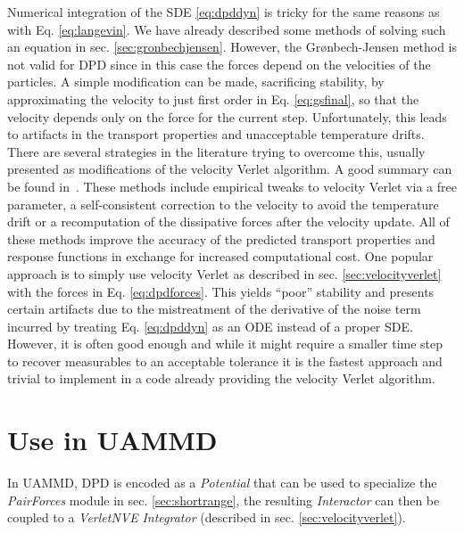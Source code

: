 \documentclass[twoside,openright,titlepage,numbers=noenddot,%
headinclude,footinclude,cleardoublepage=empty,abstract=on,
BCOR=5mm,fontsize=11pt, dvipsnames, paper=b5
]{scrreprt}
\newcommand{\uammd}{\gls{UAMMD}\xspace}
\begin{document}
Numerical integration of the \gls{SDE} \eqref{eq:dpddyn} is tricky for the same reasons as with Eq. \eqref{eq:langevin}. We have already described some methods of solving such an equation in sec. \ref{sec:gronbechjensen}. However, the Grønbech-Jensen method is not valid for \gls{DPD} since in this case the forces depend on the velocities of the particles. A simple modification can be made, sacrificing stability, by approximating the velocity to just first order in Eq. \eqref{eq:gsfinal}, so that the velocity depends only on the force for the current step. Unfortunately, this leads to artifacts in the transport properties and unacceptable temperature drifts. There are several strategies in the literature trying to overcome this, usually presented as modifications of the velocity Verlet algorithm. A good summary can be found in~\cite{Leimhuler2015}. These methods include empirical tweaks to velocity Verlet via a free parameter\cite{Groot1997}, a self-consistent correction to the velocity to avoid the temperature drift\cite{Pagonabarraga1998} or a recomputation of the dissipative forces after the velocity update\cite{Besold2000}.
All of these methods improve the accuracy of the predicted transport properties and response functions in exchange for increased computational cost. 
One popular approach is to simply use velocity Verlet as described in sec. \ref{sec:velocityverlet} with the forces in Eq. \eqref{eq:dpdforces}. This yields ``poor'' stability and presents certain artifacts\cite{Besold2000} due to the mistreatment of the derivative of the noise term incurred by treating Eq. \eqref{eq:dpddyn} as an \gls{ODE} instead of a proper \gls{SDE}. However, it is often good enough and while it might require a smaller time step to recover measurables to an acceptable tolerance it is the fastest approach and trivial to implement in a code already providing the velocity Verlet algorithm.
\section*{Use in UAMMD}
In \uammd, \gls{DPD} is encoded as a \emph{Potential} that can be used to specialize the \emph{PairForces} module in sec. \ref{sec:shortrange}, the resulting \emph{Interactor} can then be coupled to a \emph{VerletNVE} \emph{Integrator} (described in sec. \ref{sec:velocityverlet}).
\end{document}
